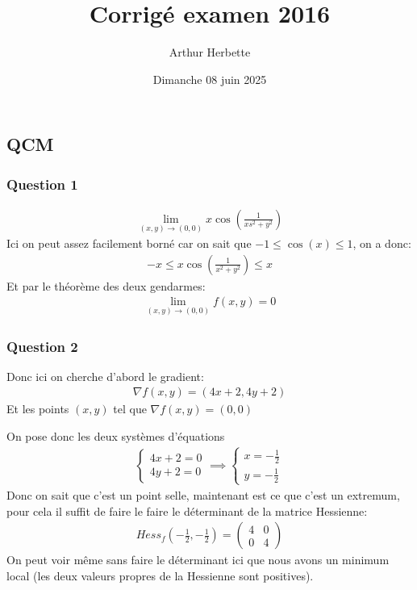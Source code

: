 \documentclass[a4paper]{article}
\title{Corrigé examen 2016}
\author{Arthur Herbette}
\date{Dimanche 08 juin 2025}
\begin{document}
\maketitle
\subsection{QCM}


\subsubsection{Question 1}

\begin{align*} 
    \lim_{\left(x, y\right) \to \left(0, 0\right)} x \cos\left(\frac{1}{xs^2 + y^2}\right)
\end{align*}
Ici on peut assez facilement borné car on sait que $-1 \leq \cos\left(x\right) \leq 1$, on a donc:
\begin{align*} 
    -x \leq x \cos\left(\frac{1}{x^2 + y^2}\right) \leq x
\end{align*}
Et par le théorème des deux gendarmes:
\begin{align*} 
    \lim_{\left(x, y\right) \to \left(0, 0\right)} f\left(x, y\right) = 0
\end{align*}
\subsubsection{Question 2}
Donc ici on cherche d'abord le gradient:
\begin{align*} 
    \nabla f\left(x, y\right) = \left(4x + 2, 4y + 2\right)
\end{align*}
Et les points $\left(x, y\right)$ tel que $\nabla f\left(x, y\right) =  \left(0, 0\right)$

On pose donc les deux systèmes d'équations
\begin{align*} 
    \begin{cases}
        4x + 2 =  0\\
        4y + 2 = 0
    \end{cases} \implies
    \begin{cases}
        x = -\frac{1}{2}\\
        y =  - \frac{1}{2}
    \end{cases}
\end{align*}
Donc on sait que c'est un point selle, maintenant est ce que c'est un extremum, pour cela il suffit de faire le faire le déterminant de la matrice Hessienne:
\begin{align*} 
Hess_f\left(-\frac{1}{2}, -\frac{1}{2}\right) = \begin{pmatrix} 4 & 0 \\ 0 & 4 \end{pmatrix} 
\end{align*}
On peut voir même sans faire le déterminant ici que nous avons un minimum local (les deux valeurs propres de la Hessienne sont positives).
\end{document}
